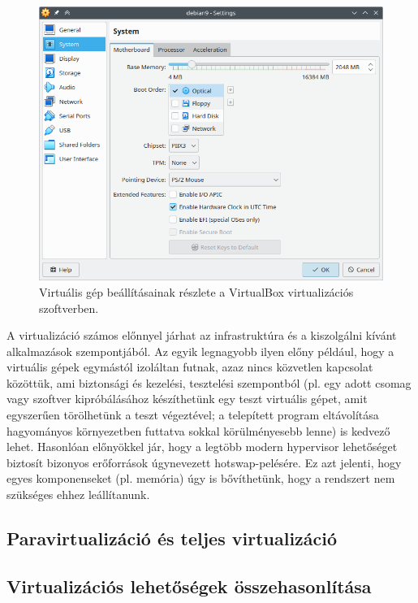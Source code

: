 \begin{figure}[!ht]
	\centering
	\includegraphics[width=120mm, keepaspectratio]{figures/virtualbox-vm-settings.png}
	\caption{Virtuális gép beállításainak részlete a VirtualBox virtualizációs szoftverben.}
	\label{fig:vboxsettings}
\end{figure}


A virtualizáció számos előnnyel járhat az infrastruktúra és a kiszolgálni kívánt alkalmazások szempontjából. Az egyik legnagyobb ilyen előny például, hogy a virtuális gépek egymástól izoláltan futnak, azaz nincs közvetlen kapcsolat közöttük, ami biztonsági és kezelési, tesztelési szempontból (pl. egy adott csomag vagy szoftver kipróbálásához készíthetünk egy teszt virtuális gépet, amit egyszerűen törölhetünk a teszt végeztével; a telepített program eltávolítása hagyományos környezetben futtatva sokkal körülményesebb lenne) is kedvező lehet. Hasonlóan előnyökkel jár, hogy a legtöbb modern \gls{hypervisor} lehetőséget biztosít bizonyos erőforrások úgynevezett \gls{hotswap}-pelésére. Ez azt jelenti, hogy egyes komponenseket (pl. memória) úgy is bővíthetünk, hogy a rendszert nem szükséges ehhez leállítanunk.

\subsection{Paravirtualizáció és teljes virtualizáció}

\subsection{Virtualizációs lehetőségek összehasonlítása} \label{sect:hypervisor-comparision}



